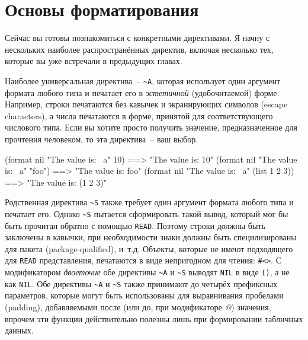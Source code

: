 \section{Основы форматирования}

Сейчас вы готовы познакомиться с конкретными директивами. Я начну с нескольких наиболее
распространённых директив, включая несколько тех, которые вы уже встречали в предыдущих
главах.

Наиболее универсальная директива~-- \lstinline!~A!, которая использует один аргумент
формата любого типа и печатает его в \textit{эстетичной} (удобочитаемой) форме. Например,
строки печатаются без кавычек и экранирующих символов (escape characters), а числа
печатаются в форме, принятой для соответствующего числового типа. Если вы хотите просто
получить значение, предназначенное для прочтения человеком, то эта директива~-- ваш выбор.

\begin{myverb}
(format nil "The value is: ~a" 10)           ==> "The value is: 10"
(format nil "The value is: ~a" "foo")        ==> "The value is: foo"
(format nil "The value is: ~a" (list 1 2 3)) ==> "The value is: (1 2 3)"
\end{myverb}

Родственная директива \lstinline!~S! также требует один аргумент формата любого типа и
печатает его. Однако \lstinline!~S!  пытается сформировать такой вывод, который мог бы
быть прочитан обратно с помощью \lstinline{READ}. Поэтому строки должны быть заключены в
кавычки, при необходимости знаки должны быть специлизированы для пакета
(package-qualified), и~т.д.  Объекты, которые не имеют подходящего для \lstinline{READ}
представления, печатаются в виде непригодном для чтения: \lstinline!#<>!.  С модификатором
\textit{двоеточие} обе директивы \lstinline!~A! и \lstinline!~S!  выводят
\lstinline{NIL} в виде \lstinline{()}, а не как \lstinline{NIL}. Обе директивы
\lstinline!~A! и \lstinline!~S! также принимают до четырёх префиксных параметров, которые
могут быть использованы для выравнивания пробелами (padding), добавляемыми после
(или до, при модификаторе \textit{@}) значения, впрочем эти функции действительно полезны
лишь при формировании табличных данных.

